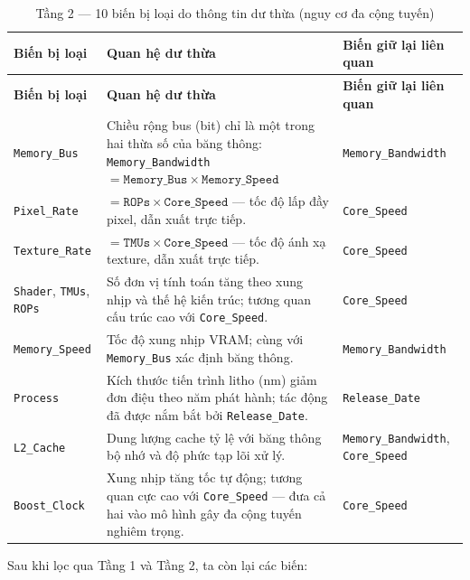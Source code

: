 \renewcommand{\arraystretch}{1.1}
\small
\setlength\LTleft{\fill}
\setlength\LTright{\fill}
\begin{longtable}{|p{3.5cm}|p{6.8cm}|p{3.2cm}|}
\caption{Tầng 2 --- 10 biến bị loại do thông tin dư thừa (nguy cơ đa cộng tuyến)}
\label{tab:tier2_vars} \\
\hline
\textbf{Biến bị loại} & \textbf{Quan hệ dư thừa} & \textbf{Biến giữ lại liên quan} \\
\hline
\endfirsthead
\hline
\textbf{Biến bị loại} & \textbf{Quan hệ dư thừa} & \textbf{Biến giữ lại liên quan} \\
\hline
\endhead
\hline
\endlastfoot
\texttt{Memory\_Bus}
  & Chiều rộng bus (bit) chỉ là một trong hai thừa số của băng thông: \texttt{Memory\_Bandwidth} $= \texttt{Memory\_Bus} \times \texttt{Memory\_Speed}$
  & \texttt{Memory\_Bandwidth} \\
\hline
\texttt{Pixel\_Rate}
  & $= \texttt{ROPs} \times \texttt{Core\_Speed}$ --- tốc độ lấp đầy pixel, dẫn xuất trực tiếp.
  & \texttt{Core\_Speed} \\
\hline
\texttt{Texture\_Rate}
  & $= \texttt{TMUs} \times \texttt{Core\_Speed}$ --- tốc độ ánh xạ texture, dẫn xuất trực tiếp.
  & \texttt{Core\_Speed} \\
\hline
\texttt{Shader}, \texttt{TMUs}, \texttt{ROPs}
  & Số đơn vị tính toán tăng theo xung nhịp và thế hệ kiến trúc; tương quan cấu trúc cao với \texttt{Core\_Speed}.
  & \texttt{Core\_Speed} \\
\hline
\texttt{Memory\_Speed}
  & Tốc độ xung nhịp VRAM; cùng với \texttt{Memory\_Bus} xác định băng thông.
  & \texttt{Memory\_Bandwidth} \\
\hline
\texttt{Process}
  & Kích thước tiến trình litho (nm) giảm đơn điệu theo năm phát hành; tác động đã được nắm bắt bởi \texttt{Release\_Date}.
  & \texttt{Release\_Date} \\
\hline
\texttt{L2\_Cache}
  & Dung lượng cache tỷ lệ với băng thông bộ nhớ và độ phức tạp lõi xử lý.
  & \texttt{Memory\_Bandwidth}, \texttt{Core\_Speed} \\
\hline
\texttt{Boost\_Clock}
  & Xung nhịp tăng tốc tự động; tương quan cực cao với \texttt{Core\_Speed} --- đưa cả hai vào mô hình gây đa cộng tuyến nghiêm trọng.
  & \texttt{Core\_Speed} \\
\hline
\end{longtable}
\normalsize

Sau khi lọc qua Tầng 1 và Tầng 2, ta còn lại các biến:


